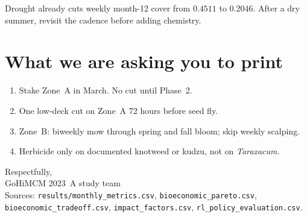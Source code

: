 \documentclass[11pt]{article}
\begin{document}
Drought already cuts weekly month-12 cover from $0.4511$ to $0.2046$.
After a dry summer, revisit the cadence before adding chemistry.

\section*{What we are asking you to print}

\begin{enumerate}
  \item Stake Zone~A in March. No cut until Phase~2.
  \item One low-deck cut on Zone~A 72 hours before seed fly.
  \item Zone~B: biweekly mow through spring and fall bloom; skip weekly
        scalping.
  \item Herbicide only on documented knotweed or kudzu, not on
        \emph{Taraxacum}.
\end{enumerate}

\vspace{1.2em}
\noindent
Respectfully,\\[0.6em]
GoHiMCM 2023~A study team\\
{\small Sources: \texttt{results/monthly\_metrics.csv},
\texttt{bioeconomic\_pareto.csv},
\texttt{bioeconomic\_tradeoff.csv},
\texttt{impact\_factors.csv},
\texttt{rl\_policy\_evaluation.csv}.}
\end{document}
